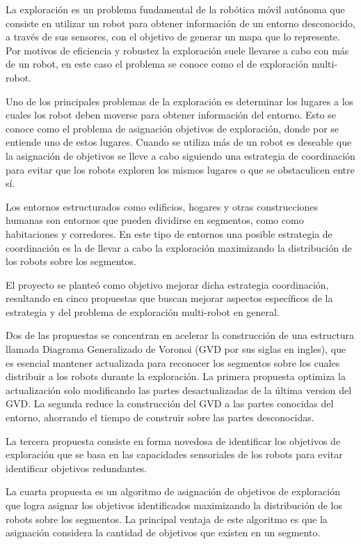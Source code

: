 La exploración es un problema fundamental de la robótica móvil autónoma que
consiste en utilizar un robot para obtener información de un entorno
desconocido, a través de sus sensores, con el objetivo de generar un mapa que lo
represente. Por motivos de eficiencia y robustez la exploración suele llevarse
a cabo con más de un robot, en este caso el problema se conoce como el de
exploración multi-robot.

Uno de los principales problemas de la exploración es determinar los lugares a
los cuales los robot deben moverse para obtener información del entorno. Esto
se conoce como el problema de asignación objetivos de exploración, donde por
 se entiende uno de estos lugares. Cuando se
utiliza más de un robot es deseable que la asignación de objetivos se lleve
a cabo siguiendo una estrategia de coordinación para evitar que los robots
exploren los mismos lugares o que se obstaculicen entre sí.

Los entornos estructurados como edificios, hogares y otras construcciones
humanas son entornos que pueden dividirse en segmentos, como como habitaciones
y corredores. En este tipo de entornos una posible estrategia de coordinación
es la de llevar a cabo la exploración maximizando la distribución de los
robots sobre los segmentos. 

El proyecto se planteó como objetivo mejorar dicha estrategia coordinación,
resultando en cinco propuestas que buscan mejorar aspectos específicos de la
estrategia y del problema de exploración multi-robot en general.

Dos de las propuestas se concentran en acelerar la construcción de una
estructura llamada Diagrama Generalizado de Voronoi (GVD por sus siglas en
ingles), que es esencial mantener actualizada para reconocer los segmentos
sobre los cuales distribuir a los robots durante la exploración. La primera
propuesta optimiza la actualización solo modificando las partes desactualizadas 
de la última version del GVD. La segunda reduce la construcción del GVD a las
partes conocidas del entorno, ahorrando el tiempo de construir sobre las
partes desconocidas.

La tercera propuesta consiste en forma novedosa de identificar los objetivos de exploración
que se basa en las capacidades sensoriales de los robots para evitar
identificar objetivos redundantes.

La cuarta propuesta es un algoritmo de asignación de objetivos de exploración que
logra asignar los objetivos identificados maximizando la distribución de los
robots sobre los segmentos. La principal ventaja de este algoritmo es que la
asignación considera la cantidad de objetivos que existen en un segmento.

